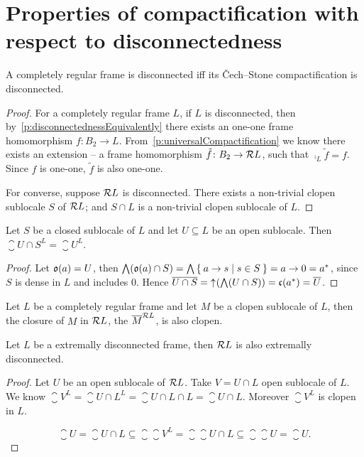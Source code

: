\section{Properties of compactification with respect to disconnectedness}

\begin{proposition}
    A completely regular frame is disconnected iff its Čech--Stone compactification is disconnected.
\end{proposition}
\begin{proof}
    For a completely regular frame $L$, if $L$ is disconnected, then by~\ref{p:disconnectednessEquivalently} there exists an one-one frame homomorphism $f\colon B_2\to L$. From~\ref{p:universalCompactification} we know there exists an extension -- a frame homomorphism $\tilde f\colon B_2\to \mathcal{R} L$, such that $\comp_L \tilde f = f$. Since $f$ is one-one, $\tilde f$ is also one-one.

    For converse, suppose $\mathcal{R} L$ is disconnected. There exists a non-trivial clopen sublocale $S$ of $\mathcal{R} L$; and $S\cap L$ is a non-trivial clopen sublocale of $L$.
\end{proof}

\begin{lemma}
    Let $S$ be a closed sublocale of $L$ and let $U\subseteq L$ be an open sublocale. Then $\closure{U\cap S}^L = \closure{U}^L$.
\end{lemma}
\begin{proof}
    Let $\mathfrak{o}(a) = U$, then $\bigwedge (\mathfrak{o}(a)\cap S) = \bigwedge \Set{ a\to s | s \in S } = a\to 0 = a^*$, since $S$ is dense in $L$ and includes $0$. Hence $\overline{U\cap S} = \mathord{\uparrow}\mkern1mu (\bigwedge (U\cap S)) = \mathfrak{c}(a^*) = \overline{U}$.
\end{proof}

\begin{lemma}
    Let $L$ be a completely regular frame and let $M$ be a clopen sublocale of $L$, then the closure of $M$ in $\mathcal{R} L$, the $\overline{M}^{\mathcal{R} L}$, is also clopen.
\end{lemma}

\begin{proposition}\label{p:extrDiscPreserv}
    Let $L$ be a extremally disconnected frame, then $\mathcal{R} L$ is also extremally disconnected.
\end{proposition}
\begin{proof}
    Let $U$ be an open sublocale of $\mathcal{R} L$. Take $V = U\cap L$ open sublocale of $L$. We know $\closure V^L = \closure{U\cap L}^L = \closure{U\cap L}\cap L = \closure U\cap L$. Moreover $\closure V^L$ is clopen in $L$.

    $$ \closure U = \closure{U\cap L} \subseteq \closure{\closure{V}^L} = \closure{\closure U\cap L} \subseteq \closure{\closure U} = \closure U.$$
\end{proof}

